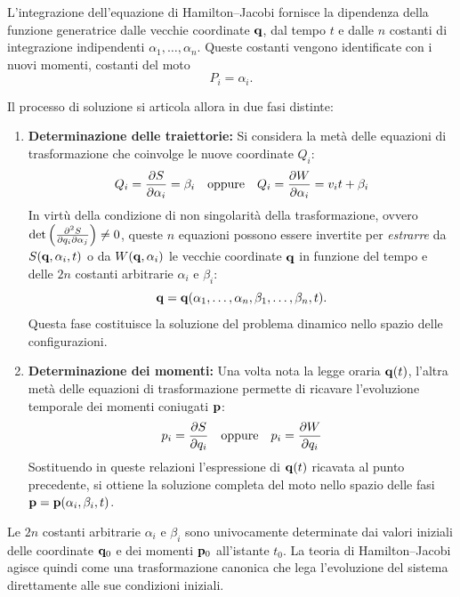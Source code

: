 L'integrazione dell'equazione di Hamilton--Jacobi fornisce la dipendenza della funzione generatrice dalle vecchie coordinate $\vb{q}$, dal tempo $t$ e dalle $n$ costanti di integrazione indipendenti $\alpha_1, \dots, \alpha_n$. Queste costanti vengono identificate con i nuovi momenti, costanti del moto 
\[P_i = \alpha_i.\]

Il processo di soluzione si articola allora in due fasi distinte:

\begin{enumerate}
    \item \textbf{Determinazione delle traiettorie:} Si considera la metà delle equazioni di trasformazione che coinvolge le nuove coordinate $Q_i$:
    \begin{equation*}
        Q_i = \pdv{S}{\alpha_i} = \beta_i \quad \text{oppure} \quad Q_i = \pdv{W}{\alpha_i} = v_i t + \beta_i
    \end{equation*}
    In virtù della condizione di non singolarità della trasformazione, ovvero $\det \left( \pdv[2]{S}{q_i}{\alpha_j} \right) \neq 0$, queste $n$ equazioni possono essere invertite per \emph{estrarre} da $S(\vb{q}, \alpha_i, t)$ o da $W(\vb{q}, \alpha_i)$ le vecchie coordinate $\vb{q}$ in funzione del tempo e delle $2n$ costanti arbitrarie $\alpha_i$ e $\beta_i$:
    \begin{equation*}
        \vb{q} = \vb{q}(\alpha_1, \dots, \alpha_n, \beta_1, \dots, \beta_n, t).
    \end{equation*}
    Questa fase costituisce la soluzione del problema dinamico nello spazio delle configurazioni.
    
    \item \textbf{Determinazione dei momenti:} Una volta nota la legge oraria $\vb{q}(t)$, l'altra metà delle equazioni di trasformazione permette di ricavare l'evoluzione temporale dei momenti coniugati $\vb{p}$:
    \begin{equation*}
        p_i = \pdv{S}{q_i} \quad \text{oppure} \quad p_i = \pdv{W}{q_i}
    \end{equation*}
    Sostituendo in queste relazioni l'espressione di $\vb{q}(t)$ ricavata al punto precedente, si ottiene la soluzione completa del moto nello spazio delle fasi $\vb{p} = \vb{p}(\alpha_i, \beta_i, t)$.
\end{enumerate}

Le $2n$ costanti arbitrarie $\alpha_i$ e $\beta_i$ sono univocamente determinate dai valori iniziali delle coordinate $\vb{q}_0$ e dei momenti $\vb{p}_0$ all'istante $t_0$. La teoria di Hamilton--Jacobi agisce quindi come una trasformazione canonica che lega l'evoluzione del sistema direttamente alle sue condizioni iniziali.

